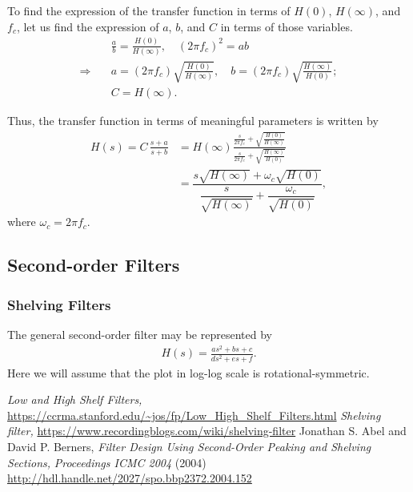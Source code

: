 \documentclass{article}
\begin{document}
\par\par
To find the expression of the transfer function in terms of $H(0)$, $H(\infty)$, and $f_c$,
let us find the expression of $a$, $b$, and $C$ in terms of those variables.
\begin{align}
&\frac{a}{b} = \frac{H(0)}{H(\infty)},\quad (2\pi f_c)^2 = ab
\\ \Rightarrow\quad&
a = (2\pi f_c)\sqrt{\frac{H(0)}{H(\infty)}},
\quad
b = (2\pi f_c)\sqrt{\frac{H(\infty)}{H(0)}};
\\
& C = H(\infty).
\end{align}

\par
Thus, the transfer function in terms of meaningful parameters is written by
\begin{align}
H(s) = C\,\frac{s+a}{s+b} &= H(\infty) \frac{\frac{s}{2\pi f_c}+\sqrt{\frac{H(0)}{H(\infty)}}}{\frac{s}{2\pi f_c}+\sqrt{\frac{H(\infty)}{H(0)}}}
\\&=\dfrac{s\sqrt{H(\infty)}+\omega_c\sqrt{H(0)}}{\dfrac{s}{\sqrt{H(\infty)}}+\dfrac{\omega_c}{\sqrt{H(0)}}},
\end{align}
where $\omega_c = 2\pi f_c$.

\subsection{Second-order Filters}
\subsubsection{Shelving Filters}
The general second-order filter may be represented by
\begin{align}
H(s) = \frac{a s^2 + b s + c}{d s^2 + e s+ f}.
\end{align}
Here we will assume that the plot in log-log scale is rotational-symmetric.

\begin{thebibliography}{100}
 \textit{Low and High Shelf Filters,} \url{https://ccrma.stanford.edu/~jos/fp/Low_High_Shelf_Filters.html}
 \textit{Shelving filter,} \url{https://www.recordingblogs.com/wiki/shelving-filter}
 Jonathan S. Abel and David P. Berners, \textit{Filter Design Using Second-Order Peaking and Shelving Sections,} \textit{Proceedings ICMC 2004} (2004) \url{http://hdl.handle.net/2027/spo.bbp2372.2004.152}
\end{thebibliography}
\end{document}
